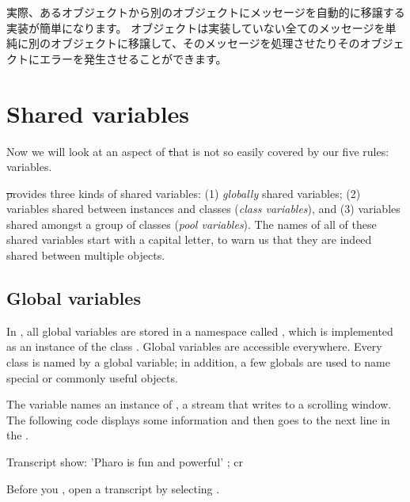 \documentclass[a4paper,10pt,twoside]{book}
\begin{document}
実際、あるオブジェクトから別のオブジェクトにメッセージを自動的に移譲する実装が簡単になります。
オブジェクトは実装していない全てのメッセージを単純に別のオブジェクトに移譲して、そのメッセージを処理させたりそのオブジェクトにエラーを発生させることができます。

\section{Shared variables}

Now we will look at an aspect of \st that is not so easily covered by our five rules:  variables.

\st provides three kinds of shared variables: (1) \emph{globally} shared variables; (2) variables shared between instances and classes (\emph{class variables}), and (3) variables shared amongst a group of  classes (\emph{pool variables}).  The names of all of these shared variables start with a capital letter, to warn us that they are indeed shared between multiple objects.

\subsection{Global variables}
In \pharo, all global variables are stored in a namespace called , which is implemented as an instance of the class .
Global variables are accessible everywhere. 
Every class is named by a global variable; in addition, a few globals are used to name special or commonly useful objects.

The variable  names an instance of , a stream that writes to a scrolling window.
The following code displays some information and then goes to the next line in the .

\begin{code}{}
Transcript show: 'Pharo is fun and powerful' ; cr
\end{code}

\noindent
Before you , open a transcript by selecting .
\end{document}
